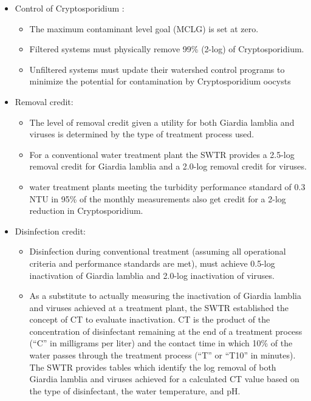 \begin{itemize}
\item Control of Cryptosporidium :
\begin{itemize}
\item The maximum contaminant level goal (MCLG) is set at zero.
\item Filtered systems must physically remove 99\% (2-log) of Cryptosporidium.
\item  Unfiltered systems must update their watershed control programs to  minimize the potential for contamination by Cryptosporidium oocysts
\end{itemize}
\item Removal credit:
\vspace{0.3cm}
\begin{itemize}
\item The level of removal credit given a utility for both Giardia lamblia and viruses is determined by the type of treatment process used. 
\item For a conventional water treatment plant the SWTR provides a 2.5-log removal credit for Giardia lamblia and a 2.0-log removal credit for viruses. 
\item water treatment plants meeting the turbidity performance standard of 0.3 NTU in 95\% of the monthly measurements also get credit for a 2-log reduction in Cryptosporidium.
\end{itemize}
\vspace{0.3cm}
\item Disinfection credit:
\vspace{0.3cm}
\begin{itemize}
\item Disinfection during conventional treatment (assuming all operational criteria and performance standards are met), must achieve 0.5-log inactivation of Giardia lamblia and 2.0-log inactivation of viruses. 
\item As a substitute to actually measuring the inactivation of Giardia lamblia and viruses achieved at a treatment plant, the SWTR established the concept of CT to evaluate inactivation. CT is the product of the concentration of disinfectant remaining at the end of a treatment process (“C” in milligrams per liter) and the contact time in which 10\% of the water passes through the treatment process (“T” or “T10” in minutes). The SWTR provides tables which identify the log removal of both Giardia lamblia and viruses achieved for a calculated CT value based on the type of disinfectant, the water temperature, and pH.
\end{itemize}

\end{itemize}
